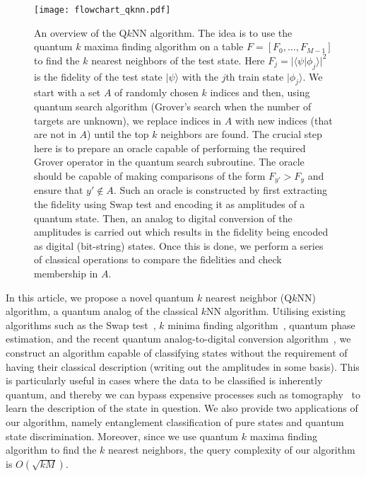 \documentclass[a4paper,twocolumn,11pt,unpublished]{quantumarticle}
\newcommand{\rang}{\rangle}
\newcommand{\lang}{\langle}
\begin{document}
    \begin{figure*}
        \center 
            \texttt{[image: flowchart\_qknn.pdf]}
            \caption{An overview of the  Q$k$NN algorithm. The idea is to use the quantum $k$ maxima finding algorithm on a table $F = [F_0,\ldots, F_{M-1}]$ to find the $k$ nearest neighbors of the test state. Here $F_j = |\lang \psi|\phi_j\rang|^2$ is the fidelity of the test state $|\psi\rang$ with the $j$th train state $|\phi_j\rang$. We start with a set $A$ of randomly chosen $k$ indices and then, using quantum search algorithm (Grover's search when the number of targets are unknown), we replace indices in $A$ with new indices (that are not in $A$) until the top $k$ neighbors are found. The crucial step here is to prepare an oracle capable of performing the required Grover operator in the quantum search subroutine. The oracle should be capable of making comparisons of the form $F_{y'} > F_y$ and ensure that $y' \notin A$. Such an oracle is constructed by first extracting the fidelity using Swap test and encoding it as amplitudes of a quantum state. Then, an analog to digital conversion of the amplitudes is carried out which results in the fidelity being encoded as digital (bit-string) states. Once this is done, we perform a series of classical operations to compare the fidelities and check membership in $A$.}\label{fig:flowchart}
    \end{figure*}

In this article, we propose a novel quantum $k$ nearest neighbor (Q$k$NN) algorithm, a quantum analog of the classical $k$NN algorithm. Utilising existing algorithms such as the Swap test~\cite{Buhrman2001}, $k$ minima finding algorithm~\cite{Durr2006}, quantum phase estimation, and the recent quantum analog-to-digital conversion algorithm~\cite{Mitarai2019}, we construct an algorithm capable of classifying states without the requirement of having their classical description (writing out the amplitudes in some basis). This is particularly useful in cases where the data to be classified is inherently quantum, and thereby we can bypass expensive processes such as tomography~\cite{Aaronson2007} to learn the description of the state in question. We also provide two applications of our algorithm, namely entanglement classification of pure states and quantum state discrimination. Moreover, since we use quantum $k$ maxima finding algorithm to find the $k$ nearest neighbors, the query complexity of our algorithm is $O(\sqrt{kM})$.
\end{document}
